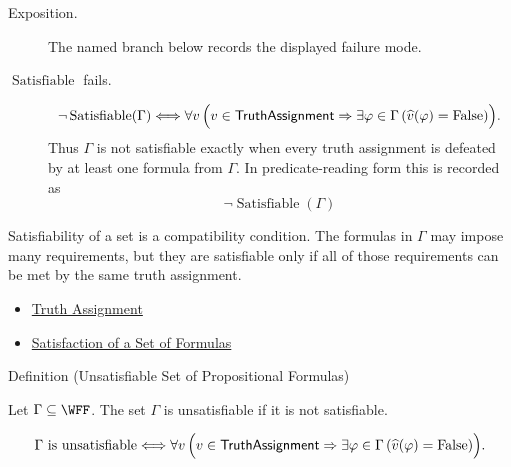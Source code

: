 \begin{remark*}
\begin{description}
  \item[Exposition.] The named branch below records the displayed failure mode.
\item[\(\operatorname{Satisfiable}\) fails.] \[
\neg\operatorname{Satisfiable}(\Gamma)
\Longleftrightarrow
\forall v\,\Bigl(v\in\mathsf{TruthAssignment}\Rightarrow
\exists\varphi\in\Gamma\,(\widehat v(\varphi)=\mathrm{False})\Bigr).
\]
Thus \(\Gamma\) is not satisfiable exactly when every truth assignment is
defeated by at least one formula from \(\Gamma\).
  In predicate-reading form this is recorded as
  \[
  \neg\operatorname{Satisfiable}(\Gamma)
  \]
\end{description}
\end{remark*}

\begin{remark*}[Interpretation]
Satisfiability of a set is a compatibility condition. The formulas in
\(\Gamma\) may impose many requirements, but they are satisfiable only if all
of those requirements can be met by the same truth assignment.
\end{remark*}

\begin{dependencies}
\begin{itemize}
  \item \hyperref[def:truth-assignment-propositional-logic]{Truth Assignment}
  \item \hyperref[def:satisfaction-set-propositional-logic]{Satisfaction of a Set of Formulas}
\end{itemize}
\end{dependencies}

\begin{definitionbox}{Definition (Unsatisfiable Set of Propositional Formulas)}
\begin{definition}
\label{def:unsatisfiable-set-of-propositional-formulas}
Let \(\Gamma\subseteq\WFF\). The set \(\Gamma\) is unsatisfiable if it is not
satisfiable.
\end{definition}
\end{definitionbox}

\begin{remark*}
\[
\Gamma\text{ is unsatisfiable}
\Longleftrightarrow
\forall v\,\Bigl(v\in\mathsf{TruthAssignment}\Rightarrow
\exists\varphi\in\Gamma\,(\widehat v(\varphi)=\mathrm{False})\Bigr).
\]
\end{remark*}

